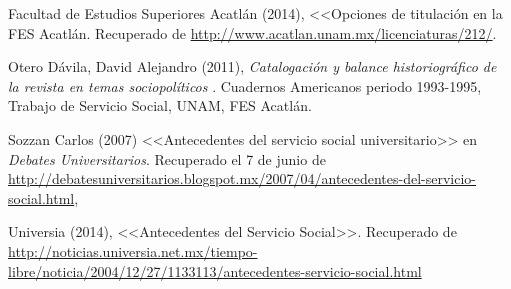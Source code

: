 Facultad de Estudios Superiores Acatlán (2014), <<Opciones de titulación en
la FES Acatlán. Recuperado de
\url{http://www.acatlan.unam.mx/licenciaturas/212/}.  


Otero Dávila, David Alejandro (2011), \textit{Catalogación y balance
historiográfico de la revista en temas sociopolíticos
}. Cuadernos Americanos periodo 1993-1995, Trabajo
de Servicio Social, UNAM, FES Acatlán.

\begin{sloppypar}
Sozzan Carlos (2007) <<Antecedentes del servicio social universitario>> en
\textit{Debates Universitarios}. Recuperado el 7 de junio de
\url{http://debatesuniversitarios.blogspot.mx/2007/04/antecedentes-del-servicio-social.html},
\end{sloppypar}

\begin{sloppypar}
Universia (2014), <<Antecedentes del Servicio Social>>. Recuperado de
\url{http://noticias.universia.net.mx/tiempo-libre/noticia/2004/12/27/1133113/antecedentes-servicio-social.html}
\end{sloppypar}
\newpage

